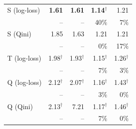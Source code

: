 \begin{tabular}{l|rrrr}
\hline
S (log-loss) & \textbf{1.61} & \textbf{1.61} & \textbf{1.14}$^\dagger$ & 1.21 \\
 & \scriptsize -- & \scriptsize -- & \scriptsize 40\% & \scriptsize 7\% \\[2pt]
S (Qini) & 1.85 & 1.63 & 1.21 & 1.21 \\
 & \scriptsize -- & \scriptsize -- & \scriptsize 0\% & \scriptsize 17\% \\[2pt]
T (log-loss) & 1.98$^\dagger$ & 1.93$^\dagger$ & 1.15$^\dagger$ & 1.26$^\dagger$ \\
 & \scriptsize -- & \scriptsize -- & \scriptsize 7\% & \scriptsize 3\% \\[2pt]
Q (log-loss) & 2.12$^\dagger$ & 2.07$^\dagger$ & 1.16$^\dagger$ & 1.43$^\dagger$ \\
 & \scriptsize -- & \scriptsize -- & \scriptsize 3\% & \scriptsize 0\% \\[2pt]
Q (Qini) & 2.13$^\dagger$ & 7.21 & 1.17$^\dagger$ & 1.46$^\dagger$ \\
 & \scriptsize -- & \scriptsize -- & \scriptsize 7\% & \scriptsize 0\% \\[2pt]
\hline
\end{tabular}
